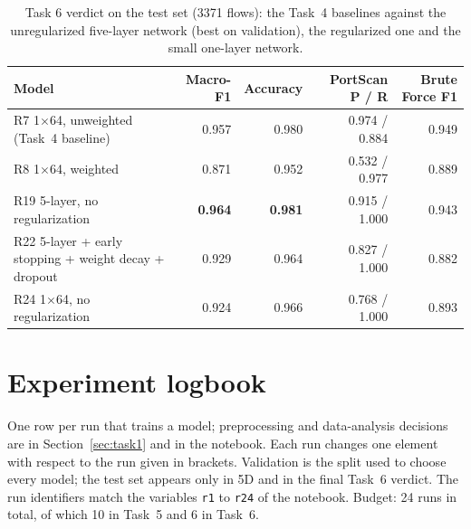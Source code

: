 \documentclass[9pt]{extarticle}
\newcommand{\run}[1]{\textsf{#1}}   %
\begin{document}
\begin{table}[htbp]
\centering\small
\caption{Task 6 verdict on the test set (3371 flows): the Task~4 baselines against the unregularized
five-layer network (best on validation), the regularized one and the small one-layer network.}
\label{tab:test6}
\begin{tabular}{@{}lrrrr@{}}
\toprule
Model & Macro-F1 & Accuracy & PortScan P / R & Brute Force F1\\
\midrule
\run{R7} 1$\times$64, unweighted (Task~4 baseline) & 0.957 & 0.980 & 0.974 / 0.884 & 0.949\\
\run{R8} 1$\times$64, weighted                      & 0.871 & 0.952 & 0.532 / 0.977 & 0.889\\
\run{R19} 5-layer, no regularization               & \textbf{0.964} & \textbf{0.981} & 0.915 / 1.000 & 0.943\\
\run{R22} 5-layer + early stopping + weight decay + dropout & 0.929 & 0.964 & 0.827 / 1.000 & 0.882\\
\run{R24} 1$\times$64, no regularization            & 0.924 & 0.966 & 0.768 / 1.000 & 0.893\\
\bottomrule
\end{tabular}
\end{table}

\clearpage
\appendix
\section{Experiment logbook}

One row per run that trains a model; preprocessing and data-analysis decisions are in
Section~\ref{sec:task1} and in the notebook. Each run changes one element with respect to the run
given in brackets. Validation is the split used to choose every model; the test set appears only in
5D and in the final Task~6 verdict. The run identifiers match the variables \texttt{r1} to \texttt{r24} of the notebook.
Budget: 24 runs in total, of which 10 in Task~5 and 6 in Task~6.
\end{document}
